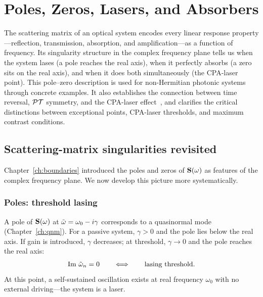 \chapter{Poles, Zeros, Lasers, and Absorbers}
\label{ch:poles-zeros}

\begin{chapterlead}
The scattering matrix of an optical system encodes every linear response
property---reflection, transmission, absorption, and amplification---as a
function of frequency. Its singularity structure in the complex frequency
plane tells us when the system lases (a pole reaches the real axis), when
it perfectly absorbs (a zero sits on the real axis), and when it does
both simultaneously (the CPA-laser point). This pole--zero description
is used for non-Hermitian photonic systems through concrete examples.
It also establishes the connection between time reversal,
$\mathcal{PT}$ symmetry, and the CPA-laser effect~\cite{novitsky2019cpa,alizadeh2025lasing}, and clarifies the critical
distinctions between exceptional points, CPA-laser thresholds, and
maximum contrast conditions.
\end{chapterlead}


\section{Scattering-matrix singularities revisited}
\label{sec:singularities-revisited}

Chapter~\ref{ch:boundaries} introduced the poles and zeros of
$\mathbf{S}(\omega)$ as features of the complex frequency plane. We now
develop this picture more systematically.

\subsection{Poles: threshold lasing}
\label{ssec:lasing-poles}

A pole of $\mathbf{S}(\omega)$ at $\tilde{\omega} = \omega_0 - i\gamma$ corresponds to
a quasinormal mode (Chapter~\ref{ch:qnm}). For a passive system,
$\gamma > 0$ and the pole lies below the real axis. If gain is introduced,
$\gamma$ decreases; at threshold, $\gamma \to 0$ and the pole reaches the
real axis:
\begin{equation}
 \operatorname{Im}\,\tilde{\omega}_n = 0
 \qquad\Longleftrightarrow\qquad
 \text{lasing threshold}.
 \label{eq:lasing-threshold}
\end{equation}
At this point, a self-sustained oscillation exists at real frequency
$\omega_0$ with no external driving---the system is a laser.

